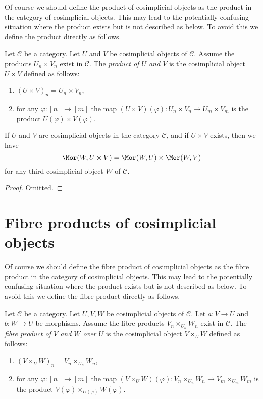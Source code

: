 \noindent
Of course we should define the product of cosimplicial objects
as the product in the category of cosimplicial objects. This
may lead to the potentially confusing situation where the product exists
but is not described as below. To avoid this we define the product
directly as follows.

\begin{definition}
\label{definition-product-cosimplicial-objects}
Let $\mathcal{C}$ be a category.
Let $U$ and $V$ be cosimplicial objects of $\mathcal{C}$.
Assume the products $U_n \times V_n$ exist in $\mathcal{C}$.
The {\it product of $U$ and $V$} is the cosimplicial object
$U \times V$ defined as follows:
\begin{enumerate}
\item $(U \times V)_n = U_n \times V_n$,
\item for any $\varphi : [n] \to [m]$ the map
$(U \times V)(\varphi) : U_n \times V_n \to U_m \times V_m$
is the product $U(\varphi) \times V(\varphi)$.
\end{enumerate}
\end{definition}

\begin{lemma}
\label{lemma-product-cosimplicial-objects}
If $U$ and $V$ are cosimplicial objects in the category $\mathcal{C}$,
and if $U \times V$ exists, then we have
$$
\Mor(W, U \times V) =
\Mor(W, U) \times
\Mor(W, V)
$$
for any third cosimplicial object $W$ of $\mathcal{C}$.
\end{lemma}

\begin{proof}
Omitted.
\end{proof}

\section{Fibre products of cosimplicial objects}
\label{section-fibre-products-cosimplicial}

\noindent
Of course we should define the fibre product of cosimplicial objects
as the fibre product in the category of cosimplicial objects. This
may lead to the potentially confusing situation where the product exists
but is not described as below. To avoid this we define the fibre product
directly as follows.

\begin{definition}
\label{definition-fibre-product-cosimplicial-objects}
Let $\mathcal{C}$ be a category.
Let $U, V, W$ be cosimplicial objects of $\mathcal{C}$.
Let $a : V \to U$ and $b : W \to U$ be morphisms.
Assume the fibre products $V_n \times_{U_n} W_n$ exist in $\mathcal{C}$.
The {\it fibre product of $V$ and $W$ over $U$} is the cosimplicial object
$V \times_U W$ defined as follows:
\begin{enumerate}
\item $(V \times_U W)_n = V_n \times_{U_n} W_n$,
\item for any $\varphi : [n] \to [m]$ the map
$(V \times_U W)(\varphi) : V_n \times_{U_n} W_n \to V_m \times_{U_m} W_m$
is the product $V(\varphi) \times_{U(\varphi)} W(\varphi)$.
\end{enumerate}
\end{definition}

